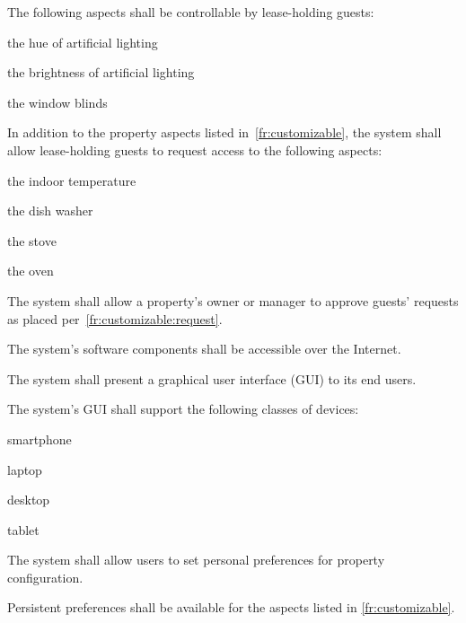 \documentclass[letter,titlepage,oneside,english]{report}
\begin{document}
\begin{fr}
\begin{fr}
    The following aspects shall be controllable by lease-holding guests:
    \begin{fr}
    \item
      the hue of artificial lighting
    \item
      the brightness of artificial lighting
    \item
      the window blinds
    \end{fr}
  \item\label{fr:customizable:request}
    In addition to the property aspects listed in~\ref{fr:customizable}, the system shall allow lease-holding guests to request access to the following aspects:
    \begin{fr}
    \item
      the indoor temperature
    \item
      the dish washer
    \item
      the stove
    \item
      the oven
    \end{fr}
  \item\label{fr:customizable:request_approve}
    The system shall allow a property's owner or manager to approve guests' requests as placed per~\ref{fr:customizable:request}.
  \end{fr}
\item\label{fr:software}
  The system's software components shall be accessible over the Internet.
  \begin{fr}
  \item\label{fr:software:ui}
    The system shall present a graphical user interface (GUI) to its end users.
  \item\label{fr:software:devices}
    The system's GUI shall support the following classes of devices:
    \begin{fr}
    \item
      smartphone
    \item
      laptop
    \item
      desktop
    \item
      tablet
    \end{fr}
  \end{fr}
\item
  The system shall allow users to set personal preferences for property configuration.
  \begin{fr}
  \item
    Persistent preferences shall be available for the aspects listed in \ref{fr:customizable}.
  \item

\end{fr}
\end{fr}
\end{document}
